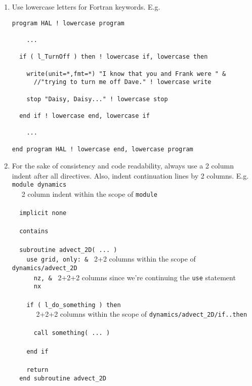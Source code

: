 \documentclass[letterpaper,12pt]{article}
\begin{document}
\begin{enumerate}
\item Use lowercase letters for Fortran keywords. \newline
E.g.
\begin{verbatim}
program HAL ! lowercase program

    ... 

  if ( l_TurnOff ) then ! lowercase if, lowercase then

    write(unit=*,fmt=*) "I know that you and Frank were " &
      //"trying to turn me off Dave." ! lowercase write

    stop "Daisy, Daisy..." ! lowercase stop

  end if ! lowercase end, lowercase if

    ...

end program HAL ! lowercase end, lowercase program 
\end{verbatim}

\item For the sake of consistency and code readability, always use a 2 column 
indent after all directives. Also, indent continuation lines by 2 columns. \newline
E.g. \\
\verb|module dynamics| \\
\verb*|  | {\small 2 column indent within the scope of \texttt{module}} \\
\verb|| \\
\verb*|  implicit|\verb| none| \\
\verb|| \\
\verb*|  contains| \\
\verb|| \\
\verb*|  subroutine|\verb| advect_2D( ... )| \\
\verb*|    use|\verb| grid, only: & | {\small 2+2 columns within the scope of \texttt{dynamics/advect\_2D}} \\
\verb*|      nz,|\verb| & | {\small 2+2+2 columns since we're continuing the \texttt{use} statement}  \\
\verb*|      nx| \\
\verb|| \\
\verb*|    if|\verb| ( l_do_something ) then| \\
\verb*|      | {\small 2+2+2 columns within the scope of \texttt{dynamics/advect\_2D/if..then}} \\
\verb|| \\
\verb*|      |\verb|call something( ... )| \\
\verb|| \\
\verb*|    end|\verb| if| \\
\verb|| \\
\verb*|    return| \\
\verb*|  end|\verb| subroutine advect_2D| \\


\end{enumerate}
\end{document}
